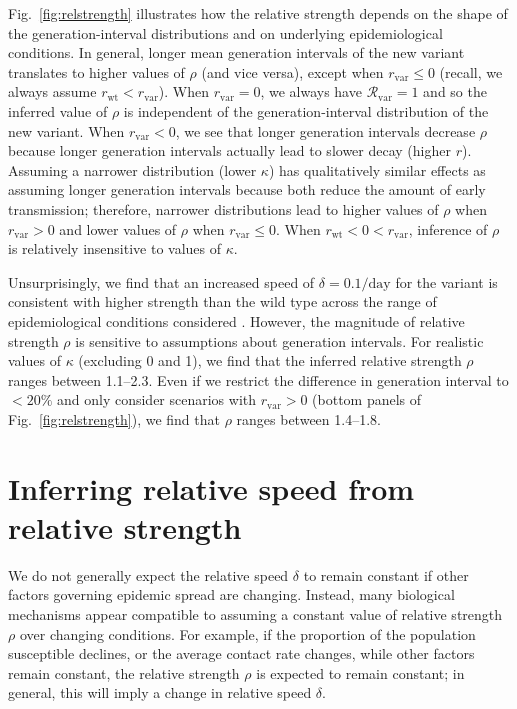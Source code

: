 \documentclass[12pt]{article}
\newcommand{\fref}[1]{Fig.~\ref{fig:#1}}
\newcommand{\vvvar}{\mathrm{var}}
\newcommand{\wwwt}{\mathrm{wt}}
\newcommand{\rx}[1]{\ensuremath{{r}_{#1}}\xspace}
\newcommand{\rw}{\rx{\wwwt}}
\newcommand{\rv}{\rx{\vvvar}}
\newcommand{\Rx}[1]{\ensuremath{{\mathcal R}_{#1}}\xspace}
\newcommand{\Rv}{\Rx{\vvvar}}
\newcommand{\pday}{\ensuremath{/\textrm{day}}}
\begin{document}
\fref{relstrength} illustrates how the relative strength depends on the shape of the generation-interval distributions and on underlying epidemiological conditions.
In general, longer mean generation intervals of the new variant translates to higher values of $\rho$ (and vice versa), except when $\rv \leq 0$ (recall, we always assume $\rw<\rv$).
When $\rv = 0$, we always have $\Rv = 1$ and so the inferred value of $\rho$ is independent of the generation-interval distribution of the new variant.
When $\rv < 0$, we see that longer generation intervals decrease $\rho$ because longer generation intervals actually lead to slower decay (higher $r$).
Assuming a narrower distribution (lower $\kappa$) has qualitatively similar effects as assuming longer generation intervals because both reduce the amount of early transmission; 
therefore, narrower distributions lead to higher values of $\rho$ when $\rv > 0$ and lower values of $\rho$ when $\rv \leq 0$.
When $\rw < 0 < \rv$, inference of $\rho$ is relatively insensitive to values of $\kappa$.

Unsurprisingly, we find that an increased speed of $\delta=0.1\pday$ for the variant is consistent with higher strength than the wild type across the range of epidemiological conditions considered \citep{switzerland2021variant, davies2021estimated, di2021impact, leung2021early, volz2021transmission,zhao2021}.
However, the magnitude of relative strength $\rho$ is sensitive to assumptions about generation intervals.
For realistic values of $\kappa$ (excluding 0 and 1), we find that the inferred relative strength $\rho$ ranges between 1.1--2.3.
Even if we restrict the difference in generation interval to $<20\%$ and only consider scenarios with $\rv>0$ (bottom panels of \fref{relstrength}), we find that $\rho$ ranges between 1.4--1.8.

\section{Inferring relative speed from relative strength}

We do not generally expect the relative speed $\delta$ to remain constant if other factors governing epidemic spread are changing.
Instead, many biological mechanisms appear compatible to assuming a constant value of relative strength $\rho$ over changing conditions.
For example, if the proportion of the population susceptible declines, or the average contact rate changes, while other factors remain constant, the relative strength $\rho$ is expected to remain constant; 
in general, this will imply a change in relative speed $\delta$.
\end{document}
